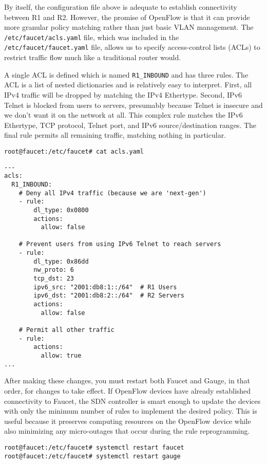 By itself, the configuration file above is adequate to establish connectivity
between R1 and R2. However, the promise of OpenFlow is that it can provide
more granular policy matching rather than just basic VLAN management. The
\verb|/etc/faucet/acls.yaml| file, which was included in the
\verb|/etc/faucet/faucet.yaml| file, allows us to specify access-control
lists (ACLs) to restrict traffic flow much like a traditional router would.

A single ACL is defined which is named \verb|R1_INBOUND| and has three rules.
The ACL is a list of nested dictionaries and is relatively easy to interpret.
First, all IPv4 traffic will be dropped by matching the IPv4 Ethertype.
Second, IPv6 Telnet is blocked from users to servers, presumably because
Telnet is insecure and we don't want it on the network at all. This complex
rule matches the IPv6 Ethertype, TCP protocol, Telnet port, and IPv6
source/destination ranges. The final rule permits all remaining traffic,
matching nothing in particular.

\begin{verbatim}
root@faucet:/etc/faucet# cat acls.yaml
\end{verbatim}

\begin{verbatim}
---
acls:
  R1_INBOUND:
    # Deny all IPv4 traffic (because we are 'next-gen')
    - rule:
        dl_type: 0x0800
        actions:
          allow: false

    # Prevent users from using IPv6 Telnet to reach servers
    - rule:
        dl_type: 0x86dd
        nw_proto: 6
        tcp_dst: 23
        ipv6_src: "2001:db8:1::/64"  # R1 Users
        ipv6_dst: "2001:db8:2::/64"  # R2 Servers
        actions:
          allow: false

    # Permit all other traffic
    - rule:
        actions:
          allow: true
...
\end{verbatim}

After making these changes, you must restart both Faucet and Gauge,
in that order, for changes to take effect. If OpenFlow devices have
already established connectivity to Faucet, the SDN controller is smart
enough to update the devices with only the minimum number of rules to
implement the desired policy. This is useful because it preserves
computing resources on the OpenFlow device while also minimizing any
micro-outages that occur during the rule reprogramming.

\begin{verbatim}
root@faucet:/etc/faucet# systemctl restart faucet
root@faucet:/etc/faucet# systemctl restart gauge
\end{verbatim}

